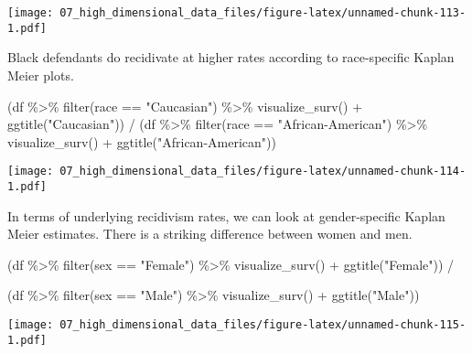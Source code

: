 \documentclass[
]{book}
\newenvironment{Shaded}{\begin{snugshade}}{\end{snugshade}}
\newcommand{\FunctionTok}[1]{\textcolor[rgb]{0.00,0.00,0.00}{#1}}
\newcommand{\NormalTok}[1]{#1}
\newcommand{\SpecialCharTok}[1]{\textcolor[rgb]{0.00,0.00,0.00}{#1}}
\newcommand{\StringTok}[1]{\textcolor[rgb]{0.31,0.60,0.02}{#1}}
\begin{document}
\texttt{[image: 07\_high\_dimensional\_data\_files/figure-latex/unnamed-chunk-113-1.pdf]}

Black defendants do recidivate at higher rates according to race-specific Kaplan Meier plots.

\begin{Shaded}
\begin{Highlighting}[]
\NormalTok{(df }\SpecialCharTok{\%\textgreater{}\%} \FunctionTok{filter}\NormalTok{(race }\SpecialCharTok{==} \StringTok{"Caucasian"}\NormalTok{) }\SpecialCharTok{\%\textgreater{}\%} \FunctionTok{visualize\_surv}\NormalTok{() }\SpecialCharTok{+} \FunctionTok{ggtitle}\NormalTok{(}\StringTok{"Caucasian"}\NormalTok{)) }\SpecialCharTok{/}
\NormalTok{(df }\SpecialCharTok{\%\textgreater{}\%} \FunctionTok{filter}\NormalTok{(race }\SpecialCharTok{==} \StringTok{"African{-}American"}\NormalTok{) }\SpecialCharTok{\%\textgreater{}\%} \FunctionTok{visualize\_surv}\NormalTok{() }\SpecialCharTok{+} \FunctionTok{ggtitle}\NormalTok{(}\StringTok{"African{-}American"}\NormalTok{)) }
\end{Highlighting}
\end{Shaded}

\texttt{[image: 07\_high\_dimensional\_data\_files/figure-latex/unnamed-chunk-114-1.pdf]}

In terms of underlying recidivism rates, we can look at gender-specific Kaplan Meier estimates. There is a striking difference between women and men.

\begin{Shaded}
\begin{Highlighting}[]
\NormalTok{(df }\SpecialCharTok{\%\textgreater{}\%} \FunctionTok{filter}\NormalTok{(sex }\SpecialCharTok{==} \StringTok{"Female"}\NormalTok{) }\SpecialCharTok{\%\textgreater{}\%} \FunctionTok{visualize\_surv}\NormalTok{() }\SpecialCharTok{+} \FunctionTok{ggtitle}\NormalTok{(}\StringTok{"Female"}\NormalTok{)) }\SpecialCharTok{/}

\NormalTok{(df }\SpecialCharTok{\%\textgreater{}\%} \FunctionTok{filter}\NormalTok{(sex }\SpecialCharTok{==} \StringTok{"Male"}\NormalTok{) }\SpecialCharTok{\%\textgreater{}\%} \FunctionTok{visualize\_surv}\NormalTok{() }\SpecialCharTok{+} \FunctionTok{ggtitle}\NormalTok{(}\StringTok{"Male"}\NormalTok{))}
\end{Highlighting}
\end{Shaded}

\texttt{[image: 07\_high\_dimensional\_data\_files/figure-latex/unnamed-chunk-115-1.pdf]}
\end{document}
